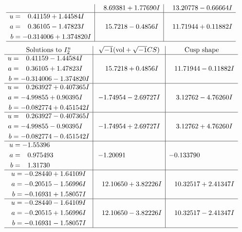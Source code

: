 \documentclass[1p]{elsarticle_modified}
\theoremstyle{definition}
\newcommand{\I}{\sqrt{-1}}
\begin{document}
$$\begin{array}{c|c|c}
 & \phantom{-}8.69381 + 1.77690 I & \phantom{-}13.20778 - 0.66664 I \\ \hline\begin{aligned}
u &= \phantom{-}0.41159 + 1.44584 I \\
a &= \phantom{-}0.36105 - 1.47823 I \\
b &= -0.314006 + 1.374820 I\end{aligned}
 & \phantom{-}15.7218 - 0.4856 I & \phantom{-}11.71944 + 0.11882 I\\
 \hline 
 \end{array}$$\newpage$$\begin{array}{c|c|c}  
\text{Solutions to }I^u_{2}& \I (\text{vol} + \sqrt{-1}CS) & \text{Cusp shape}\\
 \hline 
\begin{aligned}
u &= \phantom{-}0.41159 - 1.44584 I \\
a &= \phantom{-}0.36105 + 1.47823 I \\
b &= -0.314006 - 1.374820 I\end{aligned}
 & \phantom{-}15.7218 + 0.4856 I & \phantom{-}11.71944 - 0.11882 I \\ \hline\begin{aligned}
u &= \phantom{-}0.263927 + 0.407365 I \\
a &= -4.99855 + 0.90395 I \\
b &= -0.082774 + 0.451542 I\end{aligned}
 & -1.74954 - 2.69727 I & \phantom{-}3.12762 - 4.76260 I \\ \hline\begin{aligned}
u &= \phantom{-}0.263927 - 0.407365 I \\
a &= -4.99855 - 0.90395 I \\
b &= -0.082774 - 0.451542 I\end{aligned}
 & -1.74954 + 2.69727 I & \phantom{-}3.12762 + 4.76260 I \\ \hline\begin{aligned}
u &= -1.55396\phantom{ +0.000000I} \\
a &= \phantom{-}0.975493\phantom{ +0.000000I} \\
b &= \phantom{-}1.31730\phantom{ +0.000000I}\end{aligned}
 & -1.20091\phantom{ +0.000000I} & -0.133790\phantom{ +0.000000I} \\ \hline\begin{aligned}
u &= -0.28440 + 1.64109 I \\
a &= -0.20515 - 1.56996 I \\
b &= -0.16931 + 1.58057 I\end{aligned}
 & \phantom{-}12.10650 + 3.82226 I & \phantom{-}10.32517 + 2.41347 I \\ \hline\begin{aligned}
u &= -0.28440 - 1.64109 I \\
a &= -0.20515 + 1.56996 I \\
b &= -0.16931 - 1.58057 I\end{aligned}
 & \phantom{-}12.10650 - 3.82226 I & \phantom{-}10.32517 - 2.41347 I\\
 \hline 
 \end{array}$$\newpage
\end{document}
